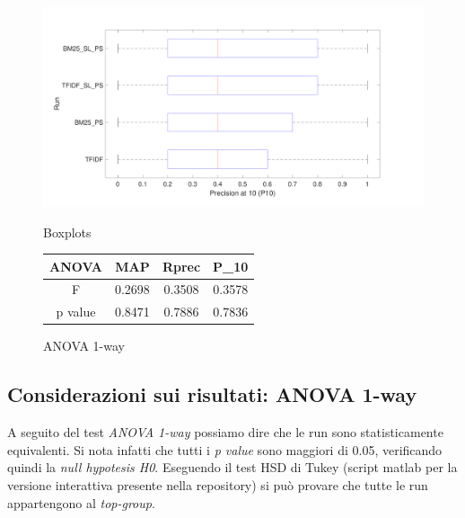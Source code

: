 \documentclass[a4paper, 9pt]{article}
\begin{document}
\begin{figure}[htp]
\begin{minipage}[b]{0.5\linewidth}
\centering
\includegraphics[width=\textwidth]{p10-boxplot.pdf}
\caption{Boxplots}
\label{fig:figure1}
\end{minipage}
\hspace{0.5cm}
\begin{minipage}[b]{0.5\linewidth}
\centering
\begin{tabular}{ |c|c|c|c| }
\hline
ANOVA & MAP & Rprec & P\_10 \\
\hline
F & 0.2698 & 0.3508 & 0.3578 \\
p value & 0.8471 & 0.7886 & 0.7836 \\
\hline
\end{tabular}
\caption{ANOVA 1-way}
\label{table:3}
\end{minipage}
\end{figure}



\subsection*{Considerazioni sui risultati: ANOVA 1-way}
\par A seguito del test \textit{ANOVA 1-way} possiamo dire che le run sono statisticamente equivalenti. 
Si nota infatti che tutti i \textit{p value} sono maggiori di 0.05, verificando quindi la \textit{null hypotesis H0}.
Eseguendo il test HSD di Tukey (script matlab per la versione interattiva presente nella repository) si può provare che tutte le run appartengono  al \textit{top-group}.
\end{document}
